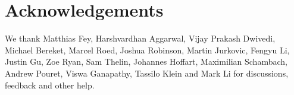 \section*{Acknowledgements}

We thank
Matthias Fey,
Harshvardhan Aggarwal,
Vijay Prakash Dwivedi,
Michael Bereket,
Marcel Roed,
Joshua Robinson,
Martin Jurkovic,
Fengyu Li,
Justin Gu,
Zoe Ryan,
Sam Thelin,
Johannes Hoffart,
Maximilian Schambach,
Andrew Pouret,
Viswa Ganapathy,
Tassilo Klein and
Mark Li
for discussions, feedback and other help.
